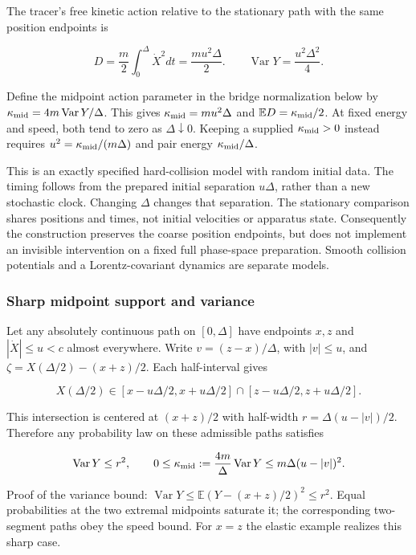 \documentclass[11pt,a4paper]{article}
\begin{document}
The tracer's free kinetic action relative to the stationary path with
the same position endpoints is

\[D=\frac m2\int_0^\Delta\dot X^2dt=\frac{mu^2\Delta}{2}.
\qquad \operatorname{Var}Y=\frac{u^2\Delta^2}{4}.\]

Define the midpoint action parameter in the bridge normalization below
by \(\kappa_{\rm mid}=4m\operatorname{Var}Y/\Delta\). This gives
\(\kappa_{\rm mid}=mu^2\Delta\) and \(\mathbb E D=\kappa_{\rm mid}/2\).
At fixed energy and speed, both tend to zero as \(\Delta\downarrow0\).
Keeping a supplied \(\kappa_{\rm mid}>0\) instead requires
\(u^2=\kappa_{\rm mid}/(m\Delta)\) and pair energy
\(\kappa_{\rm mid}/\Delta\).

This is an exactly specified hard-collision model with random initial
data. The timing follows from the prepared initial separation
\(u\Delta\), rather than a new stochastic clock. Changing \(\Delta\)
changes that separation. The stationary comparison shares positions and
times, not initial velocities or apparatus state. Consequently the
construction preserves the coarse position endpoints, but does not
implement an invisible intervention on a fixed full phase-space
preparation. Smooth collision potentials and a Lorentz-covariant
dynamics are separate models.

\hypertarget{sharp-midpoint-support-and-variance}{%
\subsubsection{Sharp midpoint support and
variance}\label{sharp-midpoint-support-and-variance}}

Let any absolutely continuous path on \([0,\Delta]\) have endpoints
\(x,z\) and \(|\dot X|\le u<c\) almost everywhere. Write
\(v=(z-x)/\Delta\), with \(|v|\le u\), and
\(\zeta=X(\Delta/2)-(x+z)/2\). Each half-interval gives

\[X(\Delta/2)\in[x-u\Delta/2,x+u\Delta/2]
\cap[z-u\Delta/2,z+u\Delta/2].\]

This intersection is centered at \((x+z)/2\) with half-width
\(r=\Delta(u-|v|)/2\). Therefore any probability law on these admissible
paths satisfies

\[\operatorname{Var}Y\le r^2,
\qquad 0\le\kappa_{\rm mid}:=\frac{4m}{\Delta}\operatorname{Var}Y
\le m\Delta(u-|v|)^2.\]

Proof of the variance bound:
\(\operatorname{Var}Y\le \mathbb E(Y-(x+z)/2)^2\le r^2\). Equal
probabilities at the two extremal midpoints saturate it; the
corresponding two-segment paths obey the speed bound. For \(x=z\) the
elastic example realizes this sharp case.
\end{document}
